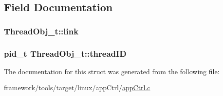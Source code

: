 \subsection{Field Documentation}
\subsubsection[{\texorpdfstring{link}{link}}]{ Thread\+Obj\+\_\+t\+::link}\hypertarget{struct_thread_obj__t_a32ce3c22d16c384ab2f76baa1cbec0f5}{}\label{struct_thread_obj__t_a32ce3c22d16c384ab2f76baa1cbec0f5}
\subsubsection[{\texorpdfstring{thread\+ID}{threadID}}]{\setlength{\rightskip}{0pt plus 5cm}pid\+\_\+t Thread\+Obj\+\_\+t\+::thread\+ID}\hypertarget{struct_thread_obj__t_a3116c3ad8c1a656012572dee23e603f1}{}\label{struct_thread_obj__t_a3116c3ad8c1a656012572dee23e603f1}


The documentation for this struct was generated from the following file\+:\begin{DoxyCompactItemize}
\item 
framework/tools/target/linux/app\+Ctrl/\hyperlink{app_ctrl_8c}{app\+Ctrl.\+c}\end{DoxyCompactItemize}
